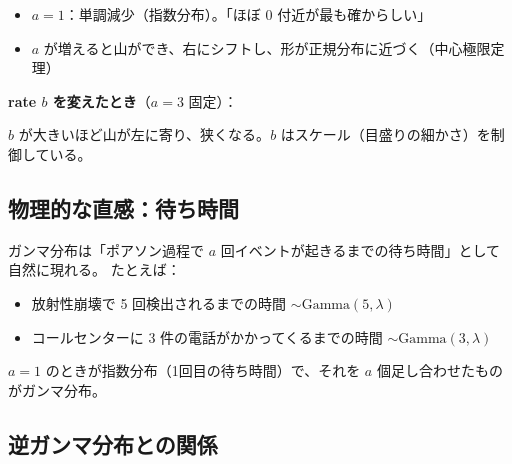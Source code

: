 \documentclass[12pt,a4paper]{ltjsarticle}
\begin{document}
\begin{itemize}
  \item $a=1$：単調減少（指数分布）。「ほぼ 0 付近が最も確からしい」
  \item $a$ が増えると山ができ、右にシフトし、形が正規分布に近づく（中心極限定理）
\end{itemize}

\bigskip
\noindent\textbf{rate $b$ を変えたとき}（$a=3$ 固定）：

\begin{center}
\end{center}

$b$ が大きいほど山が左に寄り、狭くなる。$b$ はスケール（目盛りの細かさ）を制御している。

\subsection{物理的な直感：待ち時間}

ガンマ分布は「ポアソン過程で $a$ 回イベントが起きるまでの待ち時間」として自然に現れる。
たとえば：
\begin{itemize}
  \item 放射性崩壊で 5 回検出されるまでの時間 $\sim \mathrm{Gamma}(5, \lambda)$
  \item コールセンターに 3 件の電話がかかってくるまでの時間 $\sim \mathrm{Gamma}(3, \lambda)$
\end{itemize}

$a=1$ のときが指数分布（1回目の待ち時間）で、それを $a$ 個足し合わせたものがガンマ分布。

\subsection{逆ガンマ分布との関係}
\end{document}
